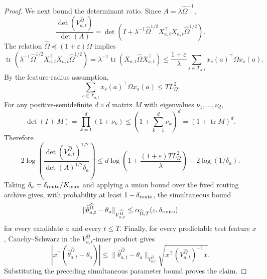 \documentclass{article} %
\begin{document}
\begin{proof}
We next bound the determinant ratio.  Since \(A=\lambda\widehat\Omega^{-1}\),
\[
\frac{\det(V_{a,t}^{\widehat\Omega})}{\det(A)}
=
\det\!\left(
I+\lambda^{-1}\widehat\Omega^{1/2}X_{a,t}^\top X_{a,t}\widehat\Omega^{1/2}
\right).
\]
The relation \(\widehat\Omega\preceq(1+\varepsilon)\Omega\) implies
\[
\operatorname{tr}\!\left(
\lambda^{-1}\widehat\Omega^{1/2}X_{a,t}^\top X_{a,t}\widehat\Omega^{1/2}
\right)
=
\lambda^{-1}\operatorname{tr}(X_{a,t}\widehat\Omega X_{a,t}^\top)
\le
\frac{1+\varepsilon}{\lambda}
\sum_{s\in\mathcal{T}_{a,t}}x_s(a)^\top\Omega x_s(a).
\]
By the feature-radius assumption,
\[
\sum_{s\in\mathcal{T}_{a,t}}x_s(a)^\top\Omega x_s(a)
\le
TL_\Omega^2.
\]
For any positive-semidefinite \(d\times d\) matrix \(M\) with eigenvalues
\(\nu_1,\ldots,\nu_d\),
\[
\det(I+M)
=
\prod_{k=1}^d(1+\nu_k)
\le
\left(1+\sum_{k=1}^d\nu_k\right)^d
=
(1+\operatorname{tr}M)^d.
\]
Therefore
\[
2\log\!\left(
\frac{\det(V_{a,t}^{\widehat\Omega})^{1/2}}
{\det(A)^{1/2}\delta_a}
\right)
\le
d\log\!\left(1+\frac{(1+\varepsilon)TL_\Omega^2}{\lambda}\right)
+
2\log(1/\delta_a).
\]
Taking \(\delta_a=\delta_{\rm route}/K_{\max}\) and applying a union bound over
the fixed routing archive gives, with probability at least
\(1-\delta_{\rm route}\), the simultaneous bound
\[
\|\widehat\theta_{a,t}^{\widehat\Omega}-\theta_a\|_{V_{a,t}^{\widehat\Omega}}
\le
\alpha_{\widehat\Omega,T}(\varepsilon,\delta_{\rm route})
\]
for every candidate \(a\) and every \(t\le T\).  Finally, for every predictable
test feature \(x\), Cauchy--Schwarz in the
\(V_{a,t}^{\widehat\Omega}\)-inner product gives
\[
\left|
x^\top(\widehat\theta_{a,t}^{\widehat\Omega}-\theta_a)
\right|
\le
\|\widehat\theta_{a,t}^{\widehat\Omega}-\theta_a\|_{V_{a,t}^{\widehat\Omega}}
\sqrt{x^\top(V_{a,t}^{\widehat\Omega})^{-1}x}.
\]
Substituting the preceding simultaneous parameter bound proves the claim.
\end{proof}
\end{document}
